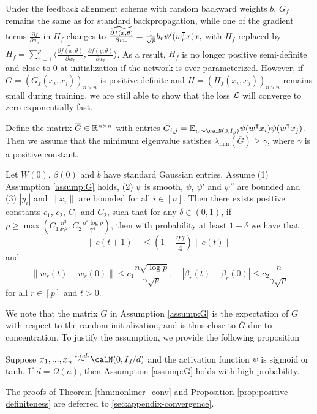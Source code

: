 Under the feedback alignment scheme with random backward weights $b$, $G_f$ remains the same as for standard backpropagation, while one of the gradient terms $\frac{\partial f}{\partial w_r}$ in $H_f$ changes to
$\widetilde{\frac{\partial f(x, \theta)}{\partial w_r}}   = \frac{1}{\sqrt{p}} b_r \psi'(w_r\transpose x)x,
$
with $H_f$ replaced by $H_f = \sum_{r=1}^p\Big\langle \widetilde{\frac{\partial f (x,\theta)}{\partial w_r}},\frac{\partial f (y,\theta)}{\partial w_r}\Big\rangle$.
As a result, $H_f$ is no longer positive semi-definite and close to $0$ at initialization if the network is over-parameterized. However, if $G = (G_f(x_i,x_j))_{n\times n}$ is positive definite and $H = (H_f(x_i,x_j))_{n\times n}$ remains small during training, we are still able to show that the loss $\mathcal{L}$ will converge to zero exponentially fast.

\begin{assumption}\label{assump:G}
Define the matrix $\overline{G} \in \mathbb{R}^{n\times n}$ with entries
$\overline{G}_{i,j} = \E_{w\sim \calN(0,I_p)}\psi(w\transpose x_i) \psi(w\transpose  x_j)$.
Then we assume that the minimum eigenvalue satisfies $\lambda_{\min}(\overline{G}) \geq \gamma$, where $\gamma$ is a positive constant.
\end{assumption}
\vskip5pt

\begin{theorem}\label{thm:nonliner_conv}
Let $W(0)$, $\beta(0)$ and $b$ have \iid standard Gaussian entries. Assume \textnormal{(1)} Assumption \ref{assump:G} holds, \textnormal{(2)} $\psi$ is smooth, $\psi$, $\psi'$ and $\psi''$ are bounded and \textnormal{(3)} $|y_i|$ and $\|x_i\|$ are bounded for all $i\in[n]$. Then there exists positive constants $c_1$, $c_2$, $C_1$ and $C_2$, such that for any $\delta\in(0,1)$, if $p \geq \max\left(C_1\frac{n^2}{\delta\gamma^2}, C_2\frac{n^4\log p}{\gamma^4}\right)$, then with probability at least $1-\delta$ we have that
\begin{equation}\label{eq:conv}
    \|e(t+1)\| \leq (1-\frac{\eta\gamma}{4})\|e(t)\|
\end{equation}
and
\begin{equation}
\label{eq:weights}
    \|w_r(t)-w_r(0)\| \leq c_1\frac{n\sqrt{\log p}}{\gamma\sqrt p}, \quad |\beta_r(t)-\beta_r(0)| \leq c_2\frac{n}{\gamma\sqrt p}
\end{equation}
for all $r\in[p]$ and $t>0$.
\end{theorem}

We note that the matrix $\overline{G}$ in Assumption \ref{assump:G} is the expectation of $G$ with respect to the random initialization, and is thus close to $\overline{G}$ due to concentration. To justify the assumption, we provide the following proposition 

\begin{proposition}\label{prop:positive-definiteness}
Suppose $x_1,...,x_n \overset{\iid}{\sim} \calN(0,I_d/d)$ and the activation function $\psi$ is sigmoid or tanh. If $d=\Omega(n)$, then Assumption \ref{assump:G} holds with high probability.
\end{proposition}

\noindent
The proofs of Theorem \ref{thm:nonliner_conv} and Proposition \ref{prop:positive-definiteness} are deferred to \cref{sec:appendix-convergence}.
